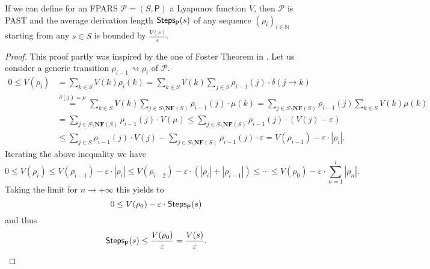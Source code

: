 \begin{theorem}
	If we can define for an FPARS $\mathcal{P}=\left(S,\mathsf{P}\right)$ a Lyapunov function $V$, then $\mathcal{P}$ is PAST and the average derivation length $\mathsf{Steps}_{\mathsf{P}}(s)$ of any sequence $(\rho_i)_{i\in\mathbb{N}}$ starting from any $s\in S$ is bounded by
	$\frac{V\left(s\right)}{\varepsilon}$.
\end{theorem}
\begin{LONG}
	\begin{proof}
		This proof partly was inspired by the one of Foster Theorem in \cite{bremaud_markov_1999}. Let us consider a generic transition $\rho_{i-1}\rightsquigarrow\rho_i$ of $\mathcal{P}$.
		\begin{equation*}
		\begin{split}
		0\leq V(\rho_i)&=\sum_{k\in S}V(k)\rho_i(k)=\sum_{k\in S}V(k)\sum_{j\in S}\rho_{i-1}(j)\cdot\delta(j\rightarrow k)\\
		&\overset{\delta(j)=\mu}{=}\sum_{k\in S}V(k)\sum_{j\in S\setminus \mathbf{NF}(S)}\rho_{i-1}(j)\cdot\mu(k)=\sum_{j\in S\setminus \mathbf{NF}(S)}\rho_{i-1}(j)\sum_{k\in S}V(k)\mu(k)\\
		&=\sum_{j\in S\setminus \mathbf{NF}(S)}\rho_{i-1}(j)\cdot V(\mu)\leq \sum_{j\in S\setminus \mathbf{NF}(S)}\rho_{i-1}(j)\cdot (V(j)-\varepsilon)\\
		&\leq \sum_{j\in S}\rho_{i-1}(j)\cdot V(j) - \sum_{j\in S\setminus \mathbf{NF}(S)}\rho_{i-1}(j)\cdot \varepsilon=V(\rho_{i-1})-\varepsilon\cdot|\rho_i|.
		\end{split}
		\end{equation*}
		Iterating the above inequality we have
		$$
		0\leq V(\rho_i)\leq V(\rho_{i-1})-\varepsilon\cdot|\rho_i|\leq V(\rho_{i-2})-\varepsilon\cdot(|\rho_i| + |\rho_{i-1}|)\leq \cdots\leq V(\rho_0)-\varepsilon\cdot\sum_{n=1}^i |\rho_n|.
		$$
		Taking the limit for $n\rightarrow +\infty$ this yields to
		$$
		0\leq V(\rho_0)-\varepsilon\cdot\mathsf{Steps}_{\mathsf{P}}(s)
		$$
		and thus
		$$
		\mathsf{Steps}_{\mathsf{P}}(s)\leq \frac{V(\rho_0)}{\varepsilon}=\frac{V(s)}{\varepsilon}.
		$$
		
	\end{proof}
\end{LONG}
